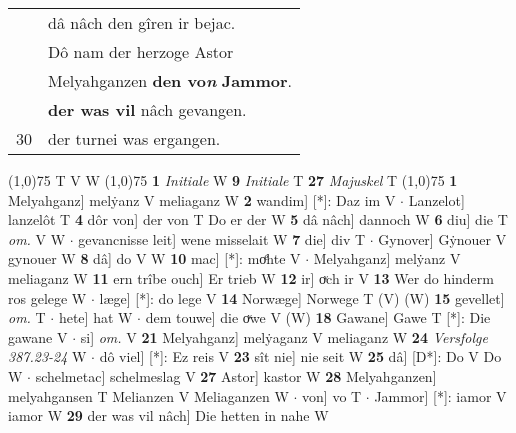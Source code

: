\documentclass[8pt,a4paper,notitlepage]{article}
\begin{document}
\begin{table}[ht]
\begin{minipage}[t]{0.5\linewidth}
\begin{tabular}{rl}
 & dâ nâch den gîren ir bejac.\\ 
 & Dô nam der herzoge Astor\\ 
 & Melyahganzen \textbf{den vo\textit{n}} \textbf{Jammor}.\\ 
 & \textbf{der was vil} nâch gevangen.\\ 
30 & der turnei was ergangen.\\ 
\end{tabular}
\scriptsize
\line(1,0){75} \newline
T V W \newline
\line(1,0){75} \newline
\textbf{1} \textit{Initiale} W  \textbf{9} \textit{Initiale} T  \textbf{27} \textit{Majuskel} T  \newline
\line(1,0){75} \newline
\textbf{1} Melyahganz] melẏanz V meliaganz W \textbf{2} wandim] [*]: Daz im V  $\cdot$ Lanzelot] lanzelôt T \textbf{4} dôr von] der von T Do er der W \textbf{5} dâ nâch] dannoch W \textbf{6} diu] die T \textit{om.} V W  $\cdot$ gevancnisse leit] wene misselait W \textbf{7} die] div T  $\cdot$ Gynover] Gẏnouer V gynouer W \textbf{8} dâ] do V W \textbf{10} mac] [*]: moͤhte V  $\cdot$ Melyahganz] melẏanz V meliaganz W \textbf{11} ern trîbe ouch] Er trieb W \textbf{12} ir] oͮch ir V \textbf{13} Wer do hinderm ros gelege W  $\cdot$ læge] [*]: do lege V \textbf{14} Norwæge] Norwege T (V) (W) \textbf{15} gevellet] \textit{om.} T  $\cdot$ hete] hat W  $\cdot$ dem touwe] die oͮwe V (W) \textbf{18} Gawane] Gawe T [*]: Die gawane V  $\cdot$ si] \textit{om.} V \textbf{21} Melyahganz] melẏaganz V meliaganz W \textbf{24} \textit{Versfolge 387.23-24} W   $\cdot$ dô viel] [*]: Ez reis V \textbf{23} sît nie] nie seit W \textbf{25} dâ] [D*]: Do V Do W  $\cdot$ schelmetac] schelmeslag V \textbf{27} Astor] kastor W \textbf{28} Melyahganzen] melyahgansen T Melianzen V Meliaganzen W  $\cdot$ von] vo T  $\cdot$ Jammor] [*]: iamor V iamor W \textbf{29} der was vil nâch] Die hetten in nahe W \newline
\end{minipage}
\end{table}
\end{document}
